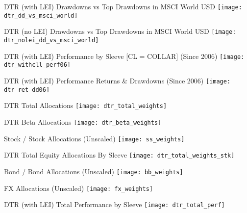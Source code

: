 \documentclass{beamer}
\begin{document}
\begin{frame}{\large DTR (with LEI) Drawdowns vs Top Drawdowns in MSCI World USD}
\texttt{[image: dtr\_dd\_vs\_msci\_world]}
\end{frame}

\begin{frame}{\large DTR (no LEI) Drawdowns vs Top Drawdowns in MSCI World USD}
\texttt{[image: dtr\_nolei\_dd\_vs\_msci\_world]}
\end{frame}

\begin{frame}{\large DTR (with LEI) Performance by Sleeve [CL = COLLAR] (Since 2006)}
\texttt{[image: dtr\_withcll\_perf06]} 
\end{frame}

\begin{frame}{\large DTR (with LEI) Performance Returns \& Drawdowns (Since 2006)}
\texttt{[image: dtr\_ret\_dd06]} 
\end{frame}

\begin{frame}{DTR Total Allocations}
\texttt{[image: dtr\_total\_weights]}
\end{frame}

\begin{frame}{DTR Beta Allocations}
\texttt{[image: dtr\_beta\_weights]}
\end{frame}

\begin{frame}{Stock / Stock Allocations (Unscaled)}
\texttt{[image: ss\_weights]}
\end{frame}

\begin{frame}{DTR Total Equity Allocations By Sleeve}
\texttt{[image: dtr\_total\_weights\_stk]}
\end{frame}


\begin{frame}{Bond / Bond Allocations (Unscaled)}
\texttt{[image: bb\_weights]}
\end{frame}

\begin{frame}{FX Allocations (Unscaled)}
\texttt{[image: fx\_weights]}
\end{frame}

\begin{frame}{DTR (with LEI) Total Performance by Sleeve}
\texttt{[image: dtr\_total\_perf]}
\end{frame}
\end{document}

